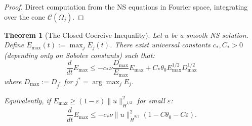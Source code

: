 \documentclass[11pt]{article}
\newtheorem{theorem}{Theorem}[section]
\theoremstyle{definition}
\begin{document}
\begin{proof}
Direct computation from the NS equations in Fourier space, integrating over the cone $\mathcal{C}(\Omega_j)$.
\end{proof}

\begin{theorem}[The Closed Coercive Inequality]\label{thm:closed-coercive}
Let $u$ be a smooth NS solution. Define $E_{\max}(t) := \max_j E_j(t)$. There exist universal constants $c_*, C_* > 0$ (depending only on Sobolev constants) such that:
\begin{equation}\label{eq:closed-coercive}
\boxed{\frac{d}{dt}E_{\max} \leq -c_* \nu \frac{D_{\max}}{E_{\max}} E_{\max} + C_* \theta_0 E_{\max}^{1/2} D_{\max}^{1/2}}
\end{equation}
where $D_{\max} := D_{j^*}$ for $j^* = \arg\max_j E_j$.

Equivalently, if $E_{\max} \geq (1-\varepsilon)\|u\|_{\dot{H}^{1/2}}^2$ for small $\varepsilon$:
\begin{equation}\label{eq:Emax-decay}
\frac{d}{dt}E_{\max} \leq -c_* \nu \|u\|_{\dot{H}^{3/2}}^2 (1 - C\theta_0 - C\varepsilon).
\end{equation}
\end{theorem}
\end{document}
